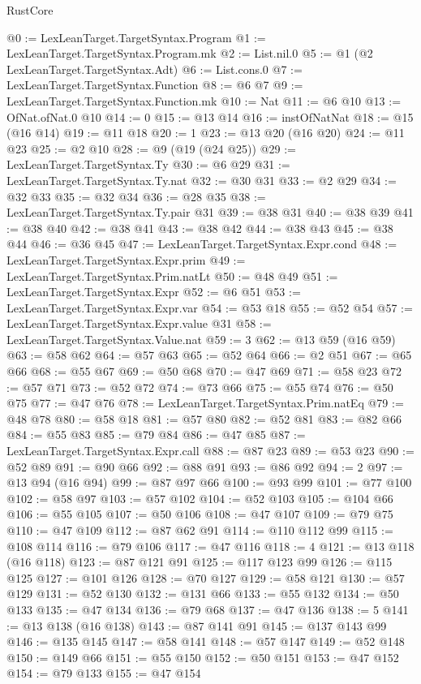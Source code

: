 \begin{lexlean}{RustCore}
\begin{coremodule}
@0 := LexLeanTarget.TargetSyntax.Program
@1 := LexLeanTarget.TargetSyntax.Program.mk
@2 := List.nil.{0}
@5 := @1 (@2 LexLeanTarget.TargetSyntax.Adt)
@6 := List.cons.{0}
@7 := LexLeanTarget.TargetSyntax.Function
@8 := @6 @7
@9 := LexLeanTarget.TargetSyntax.Function.mk
@10 := Nat
@11 := @6 @10
@13 := OfNat.ofNat.{0} @10
@14 := 0
@15 := @13 @14
@16 := instOfNatNat
@18 := @15 (@16 @14)
@19 := @11 @18
@20 := 1
@23 := @13 @20 (@16 @20)
@24 := @11 @23
@25 := @2 @10
@28 := @9 (@19 (@24 @25))
@29 := LexLeanTarget.TargetSyntax.Ty
@30 := @6 @29
@31 := LexLeanTarget.TargetSyntax.Ty.nat
@32 := @30 @31
@33 := @2 @29
@34 := @32 @33
@35 := @32 @34
@36 := @28 @35
@38 := LexLeanTarget.TargetSyntax.Ty.pair @31
@39 := @38 @31
@40 := @38 @39
@41 := @38 @40
@42 := @38 @41
@43 := @38 @42
@44 := @38 @43
@45 := @38 @44
@46 := @36 @45
@47 := LexLeanTarget.TargetSyntax.Expr.cond
@48 := LexLeanTarget.TargetSyntax.Expr.prim
@49 := LexLeanTarget.TargetSyntax.Prim.natLt
@50 := @48 @49
@51 := LexLeanTarget.TargetSyntax.Expr
@52 := @6 @51
@53 := LexLeanTarget.TargetSyntax.Expr.var
@54 := @53 @18
@55 := @52 @54
@57 := LexLeanTarget.TargetSyntax.Expr.value @31
@58 := LexLeanTarget.TargetSyntax.Value.nat
@59 := 3
@62 := @13 @59 (@16 @59)
@63 := @58 @62
@64 := @57 @63
@65 := @52 @64
@66 := @2 @51
@67 := @65 @66
@68 := @55 @67
@69 := @50 @68
@70 := @47 @69
@71 := @58 @23
@72 := @57 @71
@73 := @52 @72
@74 := @73 @66
@75 := @55 @74
@76 := @50 @75
@77 := @47 @76
@78 := LexLeanTarget.TargetSyntax.Prim.natEq
@79 := @48 @78
@80 := @58 @18
@81 := @57 @80
@82 := @52 @81
@83 := @82 @66
@84 := @55 @83
@85 := @79 @84
@86 := @47 @85
@87 := LexLeanTarget.TargetSyntax.Expr.call
@88 := @87 @23
@89 := @53 @23
@90 := @52 @89
@91 := @90 @66
@92 := @88 @91
@93 := @86 @92
@94 := 2
@97 := @13 @94 (@16 @94)
@99 := @87 @97 @66
@100 := @93 @99
@101 := @77 @100
@102 := @58 @97
@103 := @57 @102
@104 := @52 @103
@105 := @104 @66
@106 := @55 @105
@107 := @50 @106
@108 := @47 @107
@109 := @79 @75
@110 := @47 @109
@112 := @87 @62 @91
@114 := @110 @112 @99
@115 := @108 @114
@116 := @79 @106
@117 := @47 @116
@118 := 4
@121 := @13 @118 (@16 @118)
@123 := @87 @121 @91
@125 := @117 @123 @99
@126 := @115 @125
@127 := @101 @126
@128 := @70 @127
@129 := @58 @121
@130 := @57 @129
@131 := @52 @130
@132 := @131 @66
@133 := @55 @132
@134 := @50 @133
@135 := @47 @134
@136 := @79 @68
@137 := @47 @136
@138 := 5
@141 := @13 @138 (@16 @138)
@143 := @87 @141 @91
@145 := @137 @143 @99
@146 := @135 @145
@147 := @58 @141
@148 := @57 @147
@149 := @52 @148
@150 := @149 @66
@151 := @55 @150
@152 := @50 @151
@153 := @47 @152
@154 := @79 @133
@155 := @47 @154

\end{coremodule}
\end{lexlean}
